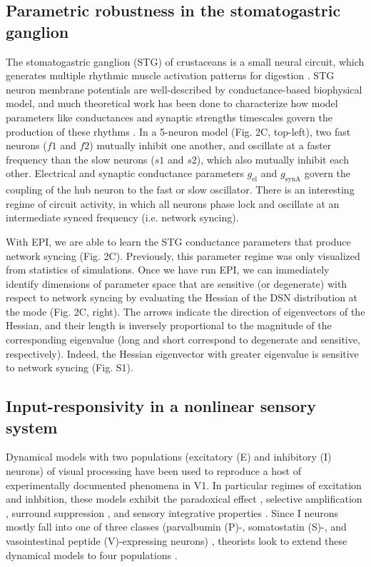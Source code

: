 \documentclass[11pt]{article}
\begin{document}
\subsection{Parametric robustness in the stomatogastric ganglion}
The stomatogastric ganglion (STG) of crustaceans is a small neural circuit, which generates multiple rhythmic muscle activation patterns for digestion \cite{marder}. STG neuron membrane potentials are well-described by conductance-based biophysical model, and much theoretical work has been done to characterize how model parameters like conductances and synaptic strengths timescales govern the production of these rhythms \cite{more marder}.  In a 5-neuron model \cite{gutierrez2013multiple} (Fig. 2C, top-left),  two fast neurons ($f1$ and $f2$) mutually inhibit one another, and oscillate at a faster frequency than the slow neurons ($s1$ and $s2$), which also mutually inhibit each other.  Electrical and synaptic conductance parameters $g_{\text{el}}$ and $g_{\text{synA}}$ govern the coupling of the hub neuron to the fast or slow oscillator.  There is an interesting regime of circuit activity, in which all neurons phase lock and oscillate at an intermediate synced frequency (i.e. network syncing). 

With EPI, we are able to learn the STG conductance parameters that produce network syncing (Fig. 2C). Previously, this parameter regime was only visualized from statistics of simulations. Once we have run EPI, we can immediately identify dimensions of parameter space that are sensitive (or degenerate) with respect to network syncing by evaluating the Hessian of the DSN distribution at the mode (Fig. 2C, right).  The arrows indicate the direction of eigenvectors of the Hessian, and their length is inversely proportional to the magnitude of the corresponding eigenvalue (long and short correspond to degenerate and sensitive, respectively).  Indeed, the Hessian eigenvector with greater eigenvalue is sensitive to network syncing (Fig. S1).

\subsection{Input-responsivity in a nonlinear sensory system}
Dynamical models with two populations (excitatory (E) and inhibitory (I) neurons) of visual processing have been used to reproduce a host of experimentally documented phenomena in V1.  In particular regimes of excitation and inhbition, these models exhibit the paradoxical effect \cite{tsodyks1997paradoxical}, selective amplification \cite{murphy2009balanced}, surround suppression \cite{ozeki2009inhibitory}, and  sensory integrative properties \cite{rubin2015stabilized}.  Since I neurons mostly fall into one of three classes (parvalbumin (P)-, somatostatin (S)-, and vasointestinal peptide (V)-expressing neurons) \cite{markram2004interneurons, rudy2011three}, theorists look to extend these dynamical models to four populations \cite{litwin2016inhibitory}.
\end{document}
